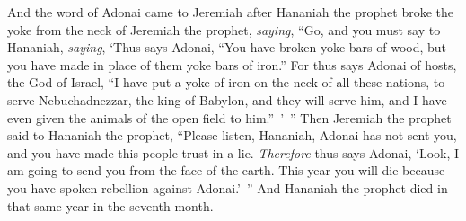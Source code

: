 \begin{biblechapter}
\verse And the word of Adonai came to Jeremiah after Hananiah the prophet broke the yoke from the neck of Jeremiah the prophet, \textit{saying},
\verse “Go, and you must say to Hananiah, \textit{saying}, ‘Thus says Adonai, “You have broken yoke bars of wood, but you have made in place of them yoke bars of iron.”
\verse For thus says Adonai of hosts, the God of Israel, “I have put a yoke of iron on the neck of all these nations, to serve Nebuchadnezzar, the king of Babylon, and they will serve him, and I have even given the animals of the open field to him.” ’ ”
\verse Then Jeremiah the prophet said to Hananiah the prophet, “Please listen, Hananiah, Adonai has not sent you, and you have made this people trust in a lie.
\verse \textit{Therefore} thus says Adonai, ‘Look, I am going to send you from the face of the earth. This year you will die because you have spoken rebellion against Adonai.’ ”
\verse And Hananiah the prophet died in that same year in the seventh month.
\end{biblechapter}

